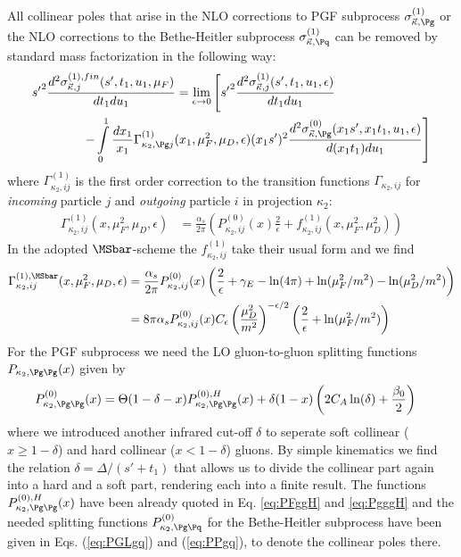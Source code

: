 All collinear poles that arise in the NLO corrections to PGF subprocess $\sigma_{\vec\kappa,\Pg}^{(1)}$ or the NLO corrections to the Bethe-Heitler subprocess $\sigma_{\vec\kappa,\Pq}^{(1)}$ can be removed by standard mass factorization in the following way:
\begin{align}
&{s'}^2\frac{d^2\sigma_{\vec \kappa,j}^{(1),fin}(s',t_1,u_1,\mu_F)}{dt_1du_1} = \lim_{\epsilon\rightarrow 0}\left[{s'}^2\frac{d^2\sigma_{\vec \kappa,j}^{(1)}(s',t_1,u_1,\epsilon)}{dt_1du_1} \right.\nonumber\\
 &\hspace{40pt}\left. -\int\limits_0^1\frac{dx_1}{x_1}\Gamma_{\kappa_2,\Pg j}^{(1)}(x_1,\mu_F^2,\mu_D,\epsilon)(x_1s')^2\frac{d^2\sigma_{\vec \kappa,\Pg}^{(0)}(x_1s',x_1t_1,u_1,\epsilon)}{d(x_1t_1)du_1} \right]
\end{align}
where $\Gamma_{\kappa_2,ij}^{(1)}$ is the first order correction to the transition functions $\Gamma_{\kappa_2,ij}$ for \textit{incoming} particle $j$ and \textit{outgoing} particle $i$ in projection $\kappa_2$:
\begin{align}
\Gamma_{\kappa_2,ij}^{(1)}(x,\mu_F^2,\mu_D,\epsilon) &= \frac{\alpha_s}{2\pi}\left(P_{\kappa_2,ij}^{(0)}(x)\frac{2}{\epsilon} + f_{\kappa_2,ij}^{(1)}(x,\mu_F^2,\mu_D^2)\right)
\end{align}
In the adopted $\MSbar$-scheme the $f_{\kappa_2,ij}^{(1)}$ take their usual form and we find
\begin{align}
\Gamma_{\kappa_2,ij}^{(1),\MSbar}(x,\mu_F^2,\mu_D,\epsilon) &= \frac{\alpha_s}{2\pi}P_{\kappa_2,ij}^{(0)}(x)\left(\frac{2}{\epsilon} +\gamma_E - \ln(4\pi) + \ln(\mu_F^2/m^2) - \ln(\mu_D^2/m^2)\right)\\
 &= 8\pi\alpha_s P_{\kappa_2,ij}^{(0)}(x) C_\epsilon \left(\frac{\mu_D^2}{m^2}\right)^{-\epsilon/2} \left(\frac{2}{\epsilon} + \ln(\mu_F^2/m^2)\right)
\end{align}
For the PGF subprocess we need the LO gluon-to-gluon splitting functions $P_{\kappa_2,\Pg\Pg}(x)$ given by\cite{Altarelli:1977zs}
\begin{align}
P_{\kappa_2,\Pg\Pg}^{(0)}(x) &= \Theta(1-\delta-x)P_{\kappa_2,\Pg\Pg}^{(0),H}(x)+\delta(1-x)\left(2C_A\ln(\delta)+\frac{\beta_0}{2}\right)
\end{align}
where we introduced another infrared cut-off $\delta$ to seperate soft collinear ($x\geq 1-\delta$) and hard collinear ($x<1-\delta$) gluons. By simple kinematics we find the relation $\delta=\Delta/(s'+t_1)$ that allows us to divide the collinear part again into a hard and a soft part, rendering each into a finite result. The functions $P_{\kappa_2,\Pg\Pg}^{(0),H}(x)$ have been already quoted in Eq. \ref{eq:PFggH} and \ref{eq:PgggH} and the needed splitting functions $P_{\kappa_2,\Pg\Pq}^{(0)}$ for the Bethe-Heitler subprocess have been given in Eqs. (\ref{eq:PGLgq}) and (\ref{eq:PPgq}), to denote the collinear poles there.

